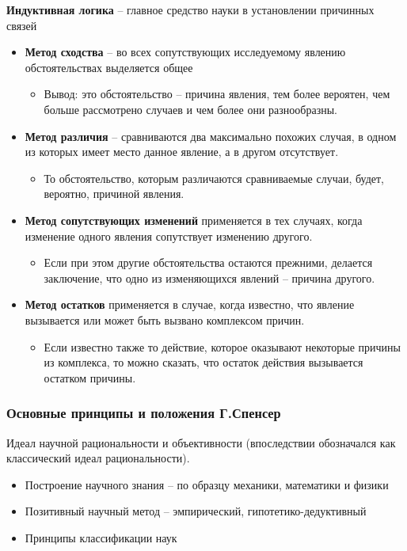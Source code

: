 \documentclass[main.tex]{subfiles}
\begin{document}
{\parindent0pt
\textbf{Индуктивная логика} -- главное средство науки в установлении причинных связей
\begin{itemize}[nosep,leftmargin=0.5cm]
\item \textbf{Метод сходства} -- во всех сопутствующих исследуемому явлению обстоятельствах выделяется общее
\begin{itemize}[nosep,leftmargin=0.6cm]
\item Вывод: это обстоятельство -- причина явления, тем более вероятен, чем больше рассмотрено случаев и чем более они разнообразны.
\end{itemize}
\item \textbf{Метод различия} -- сравниваются два максимально похожих случая, в одном из которых имеет место данное явление, а в другом отсутствует.
\begin{itemize}[nosep,leftmargin=0.6cm]
\item То обстоятельство, которым различаются сравниваемые случаи, будет, вероятно, причиной явления.
\end{itemize}
\item \textbf{Метод сопутствующих изменений} применяется в тех случаях, когда изменение одного явления сопутствует изменению другого.
\begin{itemize}[nosep,leftmargin=0.6cm]
\item Если при этом другие обстоятельства остаются прежними, делается заключение, что одно из изменяющихся явлений -- причина другого.
\end{itemize}
\item \textbf{Метод остатков} применяется в случае, когда известно, что явление вызывается или может быть вызвано комплексом причин.
\begin{itemize}[nosep,leftmargin=0.6cm]
\item Если известно также то действие, которое оказывают некоторые причины из комплекса, то можно сказать, что остаток действия вызывается остатком причины.
\end{itemize}
\end{itemize}
}



\subsubsection{Основные принципы и положения Г.Спенсер}

{\parindent0pt
Идеал научной рациональности и объективности (впоследствии обозначался как классический идеал рациональности).
\begin{itemize}[nosep,leftmargin=0.5cm]
\item Построение научного знания -- по образцу механики, математики и физики
\item Позитивный научный метод -- эмпирический, гипотетико-дедуктивный
\item Принципы классификации наук
\end{itemize}
}
\ 
\end{document}
